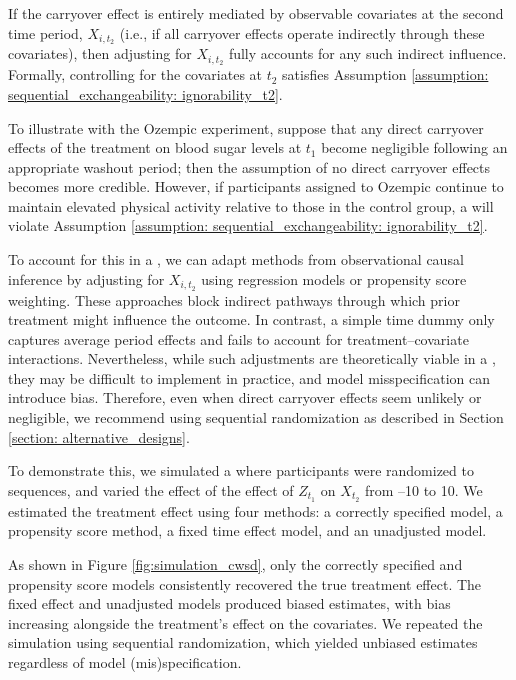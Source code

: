 If the carryover effect is entirely mediated by observable covariates at the second time period, \(X_{i,t_2}\) (i.e., if all carryover effects operate indirectly through these covariates), then adjusting for \(X_{i,t_2}\) fully accounts for any such indirect influence. Formally, controlling for the covariates at $t_2$ satisfies Assumption \ref{assumption: sequential_exchangeability: ignorability_t2}.

To illustrate with the Ozempic experiment, suppose that any direct carryover effects of the treatment on blood sugar levels at \(t_1\) become negligible following an appropriate washout period; then the assumption of no direct carryover effects becomes more credible. However, if participants assigned to Ozempic continue to maintain elevated physical activity relative to those in the control group, a \cwsd{} will violate Assumption \ref{assumption: sequential_exchangeability: ignorability_t2}.

To account for this in a \cwsd{}, we can adapt methods from observational causal inference by adjusting for $X_{i,t_2}$ using regression models or propensity score weighting. These approaches block indirect pathways through which prior treatment might influence the outcome. In contrast, a simple time dummy only captures average period effects and fails to account for treatment–covariate interactions. Nevertheless, while such adjustments are theoretically viable in a \cwsd{}, they may be difficult to implement in practice, and model misspecification can introduce bias. Therefore, even when direct carryover effects seem unlikely or negligible, we recommend using sequential randomization as described in Section \ref{section: alternative_designs}.

To demonstrate this, we simulated a \cwsd{} where participants were randomized to sequences, and varied the effect of the effect of $Z_{t_1}$ on $X_{t_2}$ from –10 to 10. We estimated the treatment effect using four methods: a correctly specified model, a propensity score method, a fixed time effect model, and an unadjusted model. 

As shown in Figure \ref{fig:simulation_cwsd}, only the correctly specified and propensity score models consistently recovered the true treatment effect. The fixed effect and unadjusted models produced biased estimates, with bias increasing alongside the treatment’s effect on the covariates. We repeated the simulation using sequential randomization, which yielded unbiased estimates regardless of model (mis)specification.


